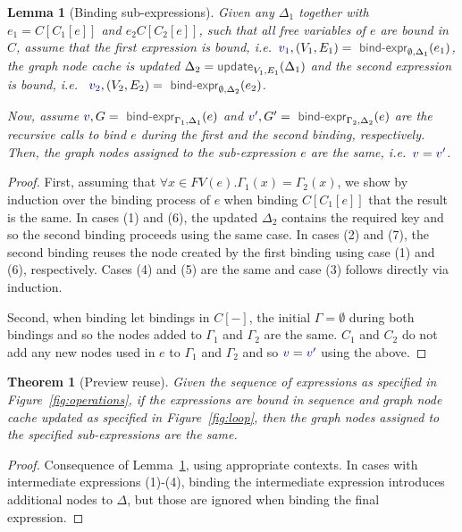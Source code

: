 \documentclass[acmsmall,anonymous,fleqn]{acmart}\settopmatter{printfolios=false,printccs=false,printacmref=false}
\newcounter{thc}
\theoremstyle{plain}
\newtheorem{lem}[thc]{Lemma}
\newtheorem{theorem}[thc]{Theorem}
\theoremstyle{definition}
\newcommand{\ident}[1]{\textnormal{\textcolor{idclr}{\sffamily #1}}}
\newcommand{\bndclr}[1]{\textcolor{kvdclr}{#1}}
\begin{document}
\begin{lem}[Binding sub-expressions]
\label{thm:sub-expr}
Given any $\Delta_1$ together with $e_1 = C[C_1[e]]$ and $e_2 C[C_2[e]]$, such that all free
variables of $e$ are bound in $C$, assume that the first expression is bound,
i.e.~$\bndclr{v_1}, (V_1, E_1) = \ident{bind-expr}_{\emptyset, \Delta_1}(e_1)$, the graph node cache
is updated $\Delta_2 = \ident{update}_{V_1, E_1}(\Delta_1)$ and the second expression is bound, i.e.~
$\bndclr{v_2}, (V_2, E_2) = \ident{bind-expr}_{\emptyset, \Delta_2}(e_2)$.

Now, assume $\bndclr{v}, G = \ident{bind-expr}_{\Gamma_1, \Delta_1}(e)$ and
$\bndclr{v'}, G' = \ident{bind-expr}_{\Gamma_2, \Delta_2}(e)$ are the recursive calls to bind
$e$ during the first and the second binding, respectively. Then, the graph nodes assigned to the
sub-expression $e$ are the same, i.e.~$\bndclr{v} = \bndclr{v'}$.
\end{lem}
\begin{proof}
First, assuming that $\forall x\in FV(e). \Gamma_1(x) = \Gamma_2(x)$, we show by induction over the binding process of $e$
when binding $C[C_1[e]]$ that the result is the same. In cases (1) and (6), the updated $\Delta_2$
contains the required key and so the second binding proceeds using the same case. In cases
(2) and (7), the second binding reuses the node created by the first binding using case (1) and
(6), respectively. Cases (4) and (5) are the same and case (3) follows directly via induction.

Second, when binding let bindings in $C[-]$, the initial $\Gamma = \emptyset$ during both bindings
and so the nodes added to $\Gamma_1$ and $\Gamma_2$ are the same. $C_1$ and $C_2$ do not add
any new nodes used in $e$ to $\Gamma_1$ and $\Gamma_2$ and so $\bndclr{v} = \bndclr{v'}$
using the above.
\end{proof}

\begin{theorem}[Preview reuse]
Given the sequence of expressions as specified in Figure~\ref{fig:operations}, if the expressions
are bound in sequence and graph node cache updated as specified in Figure~\ref{fig:loop}, then
the graph nodes assigned to the specified sub-expressions are the same.
\end{theorem}
\begin{proof}
Consequence of Lemma~\ref{thm:sub-expr}, using appropriate contexts. In cases with
intermediate expressions (1)-(4), binding the intermediate expression introduces additional
nodes to $\Delta$, but those are ignored when binding the final expression.
\end{proof}
\end{document}
